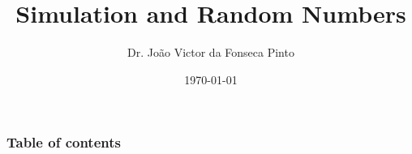 \documentclass{beamer}
\begin{document}
\title{Simulation and Random Numbers}  
\author{Dr. João Victor da Fonseca Pinto}
\date{\today} 

\begin{frame}
\titlepage
\end{frame}

\begin{frame}
    \frametitle{Table of contents}
    \tableofcontents
\end{frame} 




\end{document}
